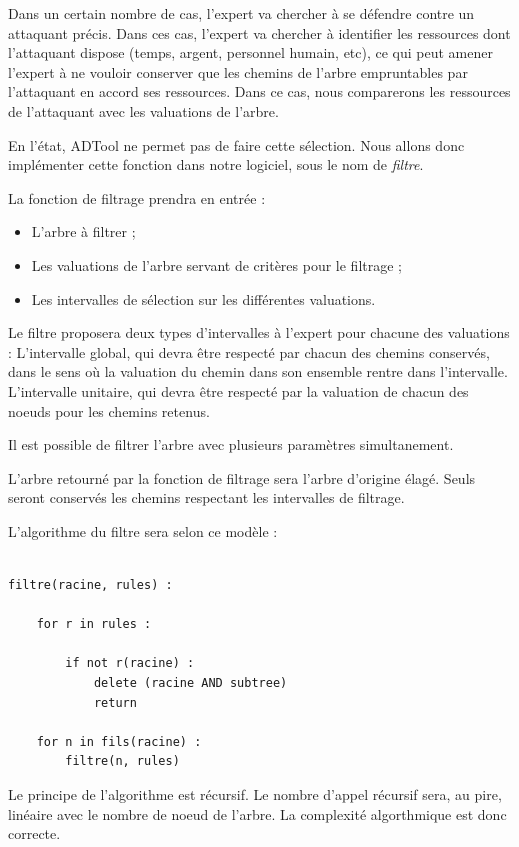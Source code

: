 		Dans un certain nombre de cas, l'expert va chercher à se défendre contre un attaquant précis. Dans ces cas, l'expert va chercher à identifier les ressources dont l'attaquant dispose (temps, argent, personnel humain, etc), ce qui peut amener l'expert à ne vouloir conserver que les chemins de l'arbre empruntables par 				l'attaquant en accord ses ressources. Dans ce cas, nous comparerons les ressources de l'attaquant avec les valuations de l'arbre.

		En l'état, ADTool ne permet pas de faire cette sélection. Nous allons donc implémenter cette fonction dans notre logiciel, sous le nom de \textit{filtre}.

		La fonction de filtrage prendra en entrée : 
		\begin{itemize}
		\item L'arbre à filtrer ;
		\item Les valuations de l'arbre servant de critères pour le filtrage ;
		\item Les intervalles de sélection sur les différentes valuations.
		\end{itemize}

		Le filtre proposera deux types d'intervalles à l'expert pour chacune des valuations :
		L'intervalle global, qui devra être respecté par chacun des chemins conservés, dans le sens où la valuation du chemin dans son ensemble rentre dans l'intervalle.
		L'intervalle unitaire, qui devra être respecté par la valuation de chacun des noeuds pour les chemins retenus.

		Il est possible de filtrer l'arbre avec plusieurs paramètres simultanement.
		
		L'arbre retourné par la fonction de filtrage sera l'arbre d'origine élagé. Seuls seront conservés les chemins respectant les intervalles de filtrage.
		
		L'algorithme du filtre sera selon ce modèle :

		\begin{lstlisting}

filtre(racine, rules) :

	for r in rules :

		if not r(racine) :
			delete (racine AND subtree)
			return

	for n in fils(racine) :
		filtre(n, rules)

\end{lstlisting}
	
		Le principe de l'algorithme est récursif.
		Le nombre d'appel récursif sera, au pire, linéaire avec le nombre de noeud de l'arbre.
		La complexité algorthmique est donc correcte.

